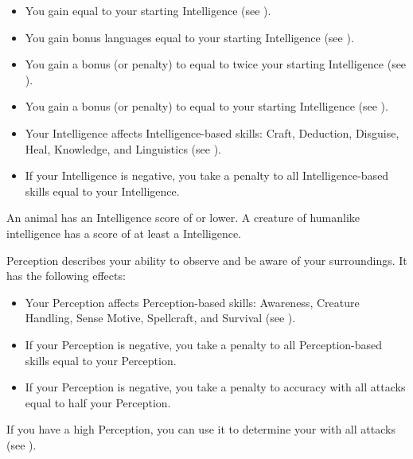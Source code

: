                 \begin{itemize}
                    \item You gain  equal to your starting Intelligence (see ).
                    \item You gain bonus languages equal to your starting Intelligence (see ).
                    \item You gain a bonus (or penalty) to  equal to twice your starting Intelligence (see ).
                    \item You gain a bonus (or penalty) to  equal to your starting Intelligence (see ).
                    \item Your Intelligence affects Intelligence-based skills: Craft, Deduction, Disguise, Heal, Knowledge, and Linguistics (see ).
                    \item If your Intelligence is negative, you take a penalty to all Intelligence-based skills equal to your Intelligence.
                \end{itemize}

                \par An animal has an Intelligence score of  or lower.
                A creature of humanlike intelligence has a score of at least a  Intelligence.

            \label{Perception}
                Perception describes your ability to observe and be aware of your surroundings.
                It has the following effects:
                \begin{itemize}
                    \item Your Perception affects Perception-based skills: Awareness, Creature Handling, Sense Motive, Spellcraft, and Survival (see ).
                    \item If your Perception is negative, you take a penalty to all Perception-based skills equal to your Perception.
                    \item If your Perception is negative, you take a penalty to accuracy with all attacks equal to half your Perception.
                \end{itemize}

                If you have a high Perception, you can use it to determine your  with all attacks (see ).


